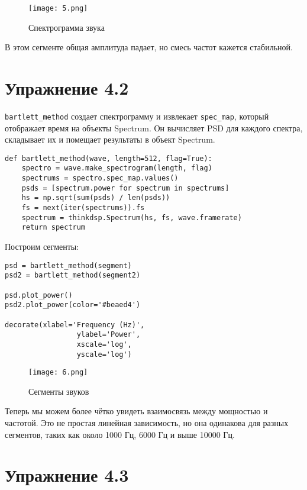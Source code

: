 \documentclass[a4paper,12pt]{report}
\begin{document}
\begin{figure}[H]
        \centering
        \texttt{[image: 5.png]}
        \caption{Спектрограмма звука}
        \label{fig:lab4_fig1_5}
\end{figure}

В этом сегменте общая амплитуда падает, но смесь частот кажется стабильной.

\chapter{Упражнение 4.2}

\texttt{bartlett\_method} создает спектрограмму и извлекает \texttt{spec\_map}, который отображает время на объекты Spectrum. Он вычисляет PSD для каждого спектра, складывает их и помещает результаты в объект Spectrum.

\begin{lstlisting}[caption=Функция bartlett\_method]
def bartlett_method(wave, length=512, flag=True):
    spectro = wave.make_spectrogram(length, flag)
    spectrums = spectro.spec_map.values()
    psds = [spectrum.power for spectrum in spectrums]
    hs = np.sqrt(sum(psds) / len(psds))
    fs = next(iter(spectrums)).fs
    spectrum = thinkdsp.Spectrum(hs, fs, wave.framerate)
    return spectrum
\end{lstlisting}

Построим сегменты:

\begin{lstlisting}[caption=Сегменты звуков]
psd = bartlett_method(segment)
psd2 = bartlett_method(segment2)

psd.plot_power()
psd2.plot_power(color='#beaed4')

decorate(xlabel='Frequency (Hz)', 
                 ylabel='Power', 
                 xscale='log', 
                 yscale='log')
\end{lstlisting}

\begin{figure}[H]
        \centering
        \texttt{[image: 6.png]}
        \caption{Сегменты звуков}
        \label{fig:lab4_fig2_1}
\end{figure}

Теперь мы можем более чётко увидеть взаимосвязь между мощностью и частотой. Это не простая линейная зависимость, но она одинакова для разных сегментов, таких как около 1000 Гц, 6000 Гц и выше 10000 Гц.
\chapter{Упражнение 4.3}
\end{document}
